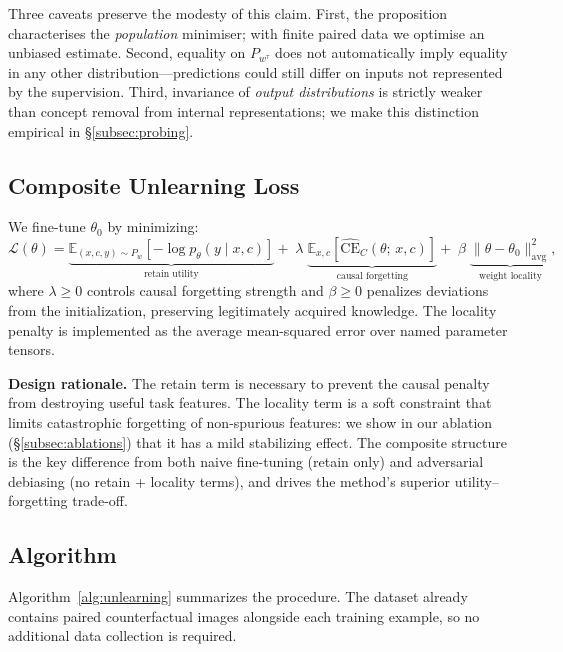 \documentclass{article}
\newcommand{\CE}{\mathrm{CE}}
\newcommand{\Loss}{\mathcal{L}}
\newcommand{\Pw}{P_w}
\newcommand{\ptheta}{p_{\theta}}
\newcommand{\EE}{\mathbb{E}}
\begin{document}
\noindent
Three caveats preserve the modesty of this claim. First, the proposition
characterises the \emph{population} minimiser; with finite paired data we
optimise an unbiased estimate.  Second, equality on $P_{w^\tau}$ does not
automatically imply equality in any other distribution---predictions could
still differ on inputs not represented by the supervision.  Third, invariance
of \emph{output distributions} is strictly weaker than concept removal from
internal representations; we make this distinction empirical in
\S\ref{subsec:probing}.

\subsection{Composite Unlearning Loss}

We fine-tune $\theta_0$ by minimizing:
\begin{equation}
  \Loss(\theta) =
  \underbrace{\EE_{(x,c,y)\sim\Pw}\!\left[-\log \ptheta(y \mid x, c)\right]}_{\text{retain utility}}
  + \;\lambda\;\underbrace{\EE_{x,c}\!\left[\widehat{\CE}_C(\theta;\, x, c)\right]}_{\text{causal forgetting}}
  + \;\beta\;\underbrace{\|\theta - \theta_0\|^2_{\mathrm{avg}}}_{\text{weight locality}},
  \label{eq:loss}
\end{equation}
where $\lambda \geq 0$ controls causal forgetting strength and $\beta \geq 0$
penalizes deviations from the initialization, preserving legitimately acquired
knowledge.  The locality penalty is implemented as the average mean-squared
error over named parameter tensors.

\textbf{Design rationale.}
The retain term is necessary to prevent the causal penalty from destroying
useful task features.  The locality term is a soft constraint that limits
catastrophic forgetting of non-spurious features: we show in our ablation
(\S\ref{subsec:ablations}) that it has a mild stabilizing effect.
The composite structure is the key difference from both naive fine-tuning
(retain only) and adversarial debiasing (no retain + locality terms), and
drives the method's superior utility–forgetting trade-off.

\subsection{Algorithm}

Algorithm~\ref{alg:unlearning} summarizes the procedure.  The dataset already
contains paired counterfactual images alongside each training example, so no
additional data collection is required.
\end{document}
